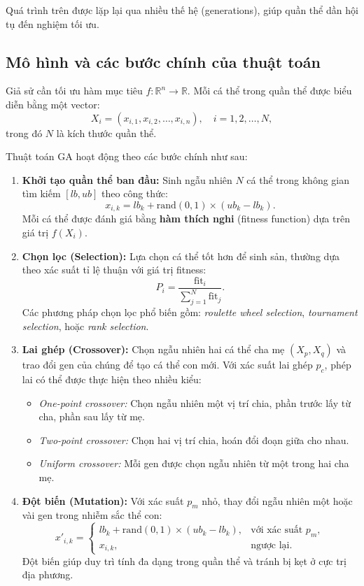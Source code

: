 \documentclass[a4paper]{report}
\begin{document}
Quá trình trên được lặp lại qua nhiều thế hệ (generations), giúp quần thể dần hội tụ đến nghiệm tối ưu.

\subsection{Mô hình và các bước chính của thuật toán}
Giả sử cần tối ưu hàm mục tiêu $f: \mathbb{R}^n \rightarrow \mathbb{R}$. Mỗi cá thể trong quần thể được biểu diễn bằng một vector:
\[
X_i = (x_{i,1}, x_{i,2}, \ldots, x_{i,n}), \quad i = 1, 2, \ldots, N,
\]
trong đó $N$ là kích thước quần thể.  

Thuật toán GA hoạt động theo các bước chính như sau:

\begin{enumerate}
    \item \textbf{Khởi tạo quần thể ban đầu:}  
    Sinh ngẫu nhiên $N$ cá thể trong không gian tìm kiếm $[lb, ub]$ theo công thức:
    \[
    x_{i,k} = lb_k + \mathrm{rand}(0,1)\times(ub_k - lb_k).
    \]
    Mỗi cá thể được đánh giá bằng \textbf{hàm thích nghi} (fitness function) dựa trên giá trị $f(X_i)$.

    \item \textbf{Chọn lọc (Selection):}  
    Lựa chọn cá thể tốt hơn để sinh sản, thường dựa theo xác suất tỉ lệ thuận với giá trị fitness:
    \[
    P_i = \frac{\mathrm{fit}_i}{\sum_{j=1}^{N}\mathrm{fit}_j}.
    \]
    Các phương pháp chọn lọc phổ biến gồm: \textit{roulette wheel selection}, \textit{tournament selection}, hoặc \textit{rank selection}.

    \item \textbf{Lai ghép (Crossover):}  
    Chọn ngẫu nhiên hai cá thể cha mẹ $(X_p, X_q)$ và trao đổi gen của chúng để tạo cá thể con mới.  
    Với xác suất lai ghép $p_c$, phép lai có thể được thực hiện theo nhiều kiểu:
    \begin{itemize}
        \item \textit{One-point crossover:} Chọn ngẫu nhiên một vị trí chia, phần trước lấy từ cha, phần sau lấy từ mẹ.
        \item \textit{Two-point crossover:} Chọn hai vị trí chia, hoán đổi đoạn giữa cho nhau.
        \item \textit{Uniform crossover:} Mỗi gen được chọn ngẫu nhiên từ một trong hai cha mẹ.
    \end{itemize}

    \item \textbf{Đột biến (Mutation):}  
    Với xác suất $p_m$ nhỏ, thay đổi ngẫu nhiên một hoặc vài gen trong nhiễm sắc thể con:
    \[
    x'_{i,k} = 
    \begin{cases}
        lb_k + \mathrm{rand}(0,1)\times(ub_k - lb_k), & \text{với xác suất } p_m,\\
        x_{i,k}, & \text{ngược lại.}
    \end{cases}
    \]
    Đột biến giúp duy trì tính đa dạng trong quần thể và tránh bị kẹt ở cực trị địa phương.


\end{enumerate}
\end{document}
